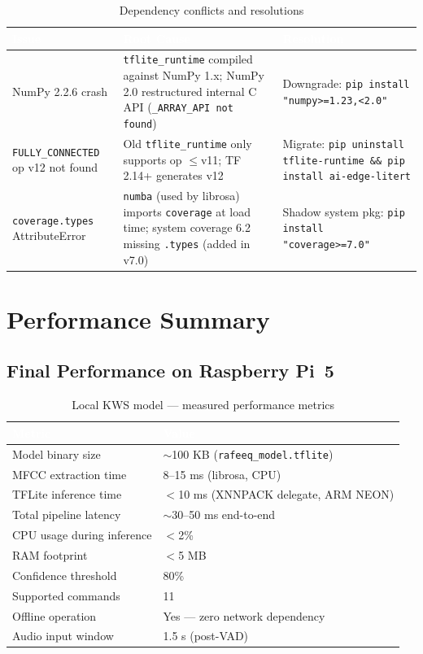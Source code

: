 \documentclass[12pt, a4paper]{report}
\newcommand{\thead}[1]{%
  \cellcolor{tableheader}\textcolor{white}{\textbf{#1}}}
\newcommand{\trow}[1]{\rowcolor{rowalt}#1}
\begin{document}
\begin{table}[h!]
\centering
\caption{Dependency conflicts and resolutions}
\label{tab:deps}
\begin{tabularx}{\textwidth}{lXX}
\toprule
\thead{Issue} & \thead{Root Cause} & \thead{Resolution} \\
\midrule
\trow{NumPy 2.2.6 crash}
  & \texttt{tflite\_runtime} compiled against NumPy 1.x;
    NumPy 2.0 restructured internal C API (\texttt{\_ARRAY\_API not found})
  & Downgrade: \texttt{pip install "numpy>=1.23,<2.0"} \\
\texttt{FULLY\_CONNECTED} op v12 not found
  & Old \texttt{tflite\_runtime} only supports op $\leq$v11;
    TF 2.14+ generates v12
  & Migrate: \texttt{pip uninstall tflite-runtime \&\& pip install ai-edge-litert} \\
\trow{\texttt{coverage.types} AttributeError}
  & \texttt{numba} (used by librosa) imports \texttt{coverage} at load time;
    system coverage 6.2 missing \texttt{.types} (added in v7.0)
  & Shadow system pkg: \texttt{pip install "coverage>=7.0"} \\
\bottomrule
\end{tabularx}
\end{table}

\chapter{Performance Summary}

\section{Final Performance on Raspberry Pi~5}

\begin{table}[h!]
\centering
\caption{Local KWS model --- measured performance metrics}
\label{tab:perf}
\begin{tabular}{ll}
\toprule
\thead{Metric} & \thead{Value} \\
\midrule
\trow{Model binary size}           & $\sim$100 KB (\texttt{rafeeq\_model.tflite}) \\
MFCC extraction time               & 8--15 ms (librosa, CPU) \\
\trow{TFLite inference time}       & $<$10 ms (XNNPACK delegate, ARM NEON) \\
Total pipeline latency             & $\sim$30--50 ms end-to-end \\
\trow{CPU usage during inference}  & $<$2\% \\
RAM footprint                      & $<$5 MB \\
\trow{Confidence threshold}        & 80\% \\
Supported commands                 & 11 \\
\trow{Offline operation}           & Yes --- zero network dependency \\
Audio input window                 & 1.5 s (post-VAD) \\
\bottomrule
\end{tabular}
\end{table}
\end{document}
